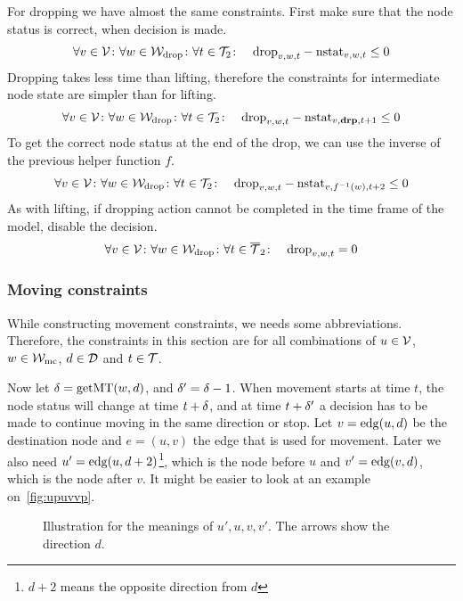 For dropping we have almost the same constraints. First make sure that the node
status is correct, when decision is made.
\begin{align}
    &\forall v \in \mathcal{V} \colon \forall w \in \mathcal{W}_\mathrm{drop} \colon \forall t \in \mathcal{T}_2 \colon
    &\mathrm{drop}_{v,w,t} - \mathrm{nstat}_{v,w,t} \leq 0
\end{align}
Dropping takes less time than lifting, therefore the constraints for
intermediate node state are simpler than for lifting.
\begin{align}
    &\forall v \in \mathcal{V} \colon \forall w \in \mathcal{W}_\mathrm{drop} \colon \forall t \in \mathcal{T}_2 \colon
    &\mathrm{drop}_{v,w,t} - \mathrm{nstat}_{v,\text{\bf drp},t+1} \leq 0
\end{align}
To get the correct node status at the end of the drop, we can use the inverse
of the previous helper function $f$.
\begin{align}
    &\forall v \in \mathcal{V} \colon \forall w \in \mathcal{W}_\mathrm{drop} \colon \forall t \in \mathcal{T}_2 \colon
    &\mathrm{drop}_{v,w,t} - \mathrm{nstat}_{v,f^{-1}(w),t+2} \leq 0
\end{align}
As with lifting, if dropping action cannot be completed in the time frame of
the model, disable the decision.
\begin{align}
    &\forall v \in \mathcal{V} \colon \forall w \in \mathcal{W}_\mathrm{drop} \colon \forall t \in \overline{\mathcal{T}}_2
    \colon &\mathrm{drop}_{v,w,t} = 0
\end{align}

\subsubsection{Moving constraints}
While constructing movement constraints, we needs some abbreviations.
Therefore, the constraints in this section are for all combinations of $u \in
\mathcal{V}$, $w \in \mathcal{W}_\mathrm{mc}$, $d \in \mathcal{D}$ and $t \in \mathcal{T}$. 

Now let $\delta = \mathrm{getMT}(w,d)$, and $\delta' = \delta-1$. When movement starts at time $t$,
the node status will change at time $t+\delta$, and at time $t+\delta'$ a decision
has to be made to continue moving in the same direction or stop. Let $v =
\mathrm{edg}(u,d)$ be the destination node and $e = (u,v)$ the edge that is used for
movement. Later we also need $u' = \mathrm{edg}(u,d+2)$\footnote{$d+2$ means the
opposite direction from $d$}, which is the node before $u$ and $v' =
\mathrm{edg}(v,d)$, which is the node after $v$. It might be easier to look at an
example on~\autoref{fig:upuvvp}.

\begin{figure}[h]
    \begin{center}
        
        \caption{Illustration for the meanings of $u',u,v,v'$. The arrows show
        the direction $d$.}
        \label{fig:upuvvp}
    \end{center}
\end{figure}

